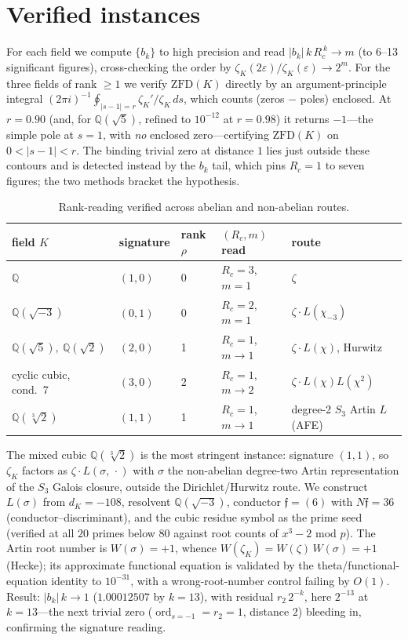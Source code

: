 \documentclass[a4paper,11pt]{article}
\theoremstyle{plain}
\theoremstyle{definition}
\theoremstyle{remark}
\newcommand{\eps}{\varepsilon}
\newcommand{\Q}{\mathbb{Q}}
\newcommand{\ord}{\operatorname{ord}}
\begin{document}
\section{Verified instances}\label{sec:instances}
For each field we compute $\{b_k\}$ to high precision and read $|b_k|\,k\,R_c^{\,k}\to m$ (to 6--13
significant figures), cross-checking the order by $\zeta_K(2\eps)/\zeta_K(\eps)\to2^m$. For the three fields
of rank $\ge1$ we verify $\mathrm{ZFD}(K)$ directly by an argument-principle integral
$(2\pi i)^{-1}\oint_{|s-1|=r}\zeta_K'/\zeta_K\,ds$, which counts (zeros $-$ poles) enclosed. At $r=0.90$
(and, for $\Q(\sqrt5)$, refined to $10^{-12}$ at $r=0.98$) it returns $-1$---the simple pole at $s=1$, with
\emph{no} enclosed zero---certifying $\mathrm{ZFD}(K)$ on $0<|s-1|<r$. The binding trivial zero at distance
$1$ lies just outside these contours and is detected instead by the $b_k$ tail, which pins $R_c=1$ to seven
figures; the two methods bracket the hypothesis.

\begin{table}[h]\centering
\begin{tabular}{@{}lllll@{}}
\toprule
field $K$ & signature & rank $\rho$ & $(R_c,m)$ read & route\\
\midrule
$\Q$ & $(1,0)$ & 0 & $R_c=3$, $m=1$ & $\zeta$\\
$\Q(\sqrt{-3})$ & $(0,1)$ & 0 & $R_c=2$, $m=1$ & $\zeta\cdot L(\chi_{-3})$\\
$\Q(\sqrt5),\ \Q(\sqrt2)$ & $(2,0)$ & 1 & $R_c=1$, $m\to1$ & $\zeta\cdot L(\chi)$, Hurwitz\\
cyclic cubic, cond.\ 7 & $(3,0)$ & 2 & $R_c=1$, $m\to2$ & $\zeta\cdot L(\chi)L(\chi^2)$\\
$\Q(\sqrt[3]2)$ & $(1,1)$ & 1 & $R_c=1$, $m\to1$ & degree-2 $S_3$ Artin $L$ (AFE)\\
\bottomrule
\end{tabular}
\caption{Rank-reading verified across abelian and non-abelian routes.}\label{tab:inst}
\end{table}

The mixed cubic $\Q(\sqrt[3]2)$ is the most stringent instance: signature $(1,1)$, so $\zeta_K$ factors as
$\zeta\cdot L(\sigma,\,\cdot)$ with $\sigma$ the non-abelian degree-two Artin representation of the $S_3$
Galois closure, outside the Dirichlet/Hurwitz route. We construct $L(\sigma)$ from $d_K=-108$, resolvent
$\Q(\sqrt{-3})$, conductor $\mathfrak f=(6)$ with $N\mathfrak f=36$ (conductor--discriminant), and the cubic
residue symbol as the prime seed (verified at all $20$ primes below $80$ against root counts of $x^3-2$
mod $p$). The Artin root number is $W(\sigma)=+1$, whence $W(\zeta_K)=W(\zeta)\,W(\sigma)=+1$ (Hecke); its
approximate functional equation is validated by the theta/functional-equation identity to $10^{-31}$, with a
wrong-root-number control failing by $O(1)$. Result: $|b_k|\,k\to1$ ($1.00012507$ by $k=13$), with residual
$r_2\,2^{-k}$, here $2^{-13}$ at $k=13$---the next trivial zero ($\ord_{s=-1}=r_2=1$, distance $2$) bleeding
in, confirming the signature reading.
\end{document}
